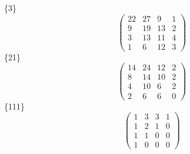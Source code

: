 \documentclass[12pt,reqno]{amsart}
\begin{document}
\Large
\{3\}                             $$ \begin{pmatrix} 
                          22 & 27 & 9 & 1 \\[6pt]
                          9 & 19 & 13 & 2 \\[6pt]
                          3 & 13 & 11 & 4 \\[6pt]
                            1 & 6 & 12 & 3
                              \end{pmatrix} $$ 
\{21\}                             $$ \begin{pmatrix} 
                         14 & 24 & 12 & 2 \\[6pt]
                          8 & 14 & 10 & 2 \\[6pt]
                          4 & 10 & 6 & 2 \\[6pt]
                             2 & 6 & 6 & 0
                              \end{pmatrix} $$ 
\{111\}                             $$ \begin{pmatrix} 
                           1 & 3 & 3 & 1 \\[6pt]
                           1 & 2 & 1 & 0 \\[6pt]
                           1 & 1 & 0 & 0 \\[6pt]
                             1 & 0 & 0 & 0
                              \end{pmatrix} $$ 
\end{document}
